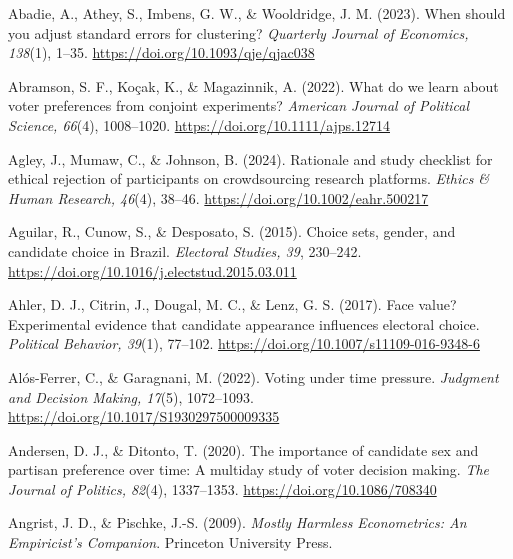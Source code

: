 \documentclass[11pt]{article}\usepackage[]{graphicx}\usepackage[]{xcolor}
\begin{document}
{\footnotesize
\begin{list}{}{%
  \setlength{\leftmargin}{1.5em}%
  \setlength{\itemindent}{-1.5em}%
  \setlength{\itemsep}{0pt}%
  \setlength{\parsep}{0pt}%
  \setlength{\topsep}{1pt}%
}
\item Abadie, A., Athey, S., Imbens, G. W., \& Wooldridge, J. M. (2023). When should you adjust standard errors for clustering? \emph{Quarterly Journal of Economics, 138}(1), 1--35. \url{https://doi.org/10.1093/qje/qjac038}

\item Abramson, S. F., Ko\c{c}ak, K., \& Magazinnik, A. (2022). What do we learn about voter preferences from conjoint experiments? \emph{American Journal of Political Science, 66}(4), 1008--1020. \url{https://doi.org/10.1111/ajps.12714}

\item Agley, J., Mumaw, C., \& Johnson, B. (2024). Rationale and study checklist for ethical rejection of participants on crowdsourcing research platforms. \emph{Ethics \& Human Research, 46}(4), 38--46. \url{https://doi.org/10.1002/eahr.500217}

\item Aguilar, R., Cunow, S., \& Desposato, S. (2015). Choice sets, gender, and candidate choice in Brazil. \emph{Electoral Studies, 39}, 230--242. \url{https://doi.org/10.1016/j.electstud.2015.03.011}

\item Ahler, D. J., Citrin, J., Dougal, M. C., \& Lenz, G. S. (2017). Face value? Experimental evidence that candidate appearance influences electoral choice. \emph{Political Behavior, 39}(1), 77--102. \url{https://doi.org/10.1007/s11109-016-9348-6}

\item Al\'os-Ferrer, C., \& Garagnani, M. (2022). Voting under time pressure. \emph{Judgment and Decision Making, 17}(5), 1072--1093. \url{https://doi.org/10.1017/S1930297500009335}

\item Andersen, D. J., \& Ditonto, T. (2020). The importance of candidate sex and partisan preference over time: A multiday study of voter decision making. \emph{The Journal of Politics, 82}(4), 1337--1353. \url{https://doi.org/10.1086/708340}

\item Angrist, J. D., \& Pischke, J.-S. (2009). \emph{Mostly Harmless Econometrics: An Empiricist's Companion}. Princeton University Press.


\end{list}}
\end{document}
